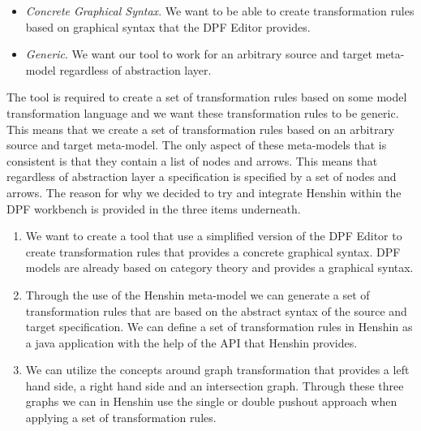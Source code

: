 \begin{itemize}

\item \textit{Concrete Graphical Syntax}. We want to be able to create
transformation rules based on graphical syntax that the DPF Editor provides.

\item \textit{Generic}. We want our tool to work for an arbitrary source and
target meta-model regardless of abstraction layer. 

\end{itemize}

The tool is required to create a set of transformation rules based on some
model transformation language and we want these transformation rules to be
generic. This means that we create a set of transformation rules based on an
arbitrary source and target meta-model. The only aspect of these meta-models
that is consistent is that they contain a list of nodes and arrows. This means
that regardless of abstraction layer a specification is specified by a set of
nodes and arrows. The reason for why we decided to try and integrate Henshin
within the DPF workbench is provided in the three items underneath. 

\begin{enumerate}

\item We want to create a tool that use a simplified version of the DPF Editor
to create transformation rules that provides a concrete graphical syntax. DPF
models are already based on category theory and provides a graphical syntax. 

\item Through the use of the Henshin meta-model we can generate a set of
transformation rules that are based on the abstract syntax of the source and
target specification. We can define a set of transformation rules in Henshin
as a java application with the help of the API that Henshin provides. 

\item We can utilize the concepts around graph transformation that provides a
left hand side, a right hand side and an intersection graph. Through these three
graphs we can in Henshin use the single or double pushout approach when applying
a set of transformation rules. 

\end{enumerate}

